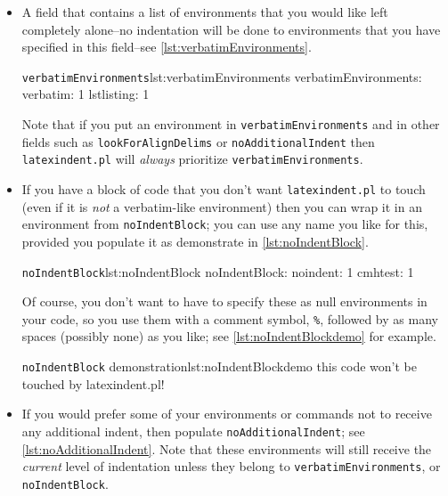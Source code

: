 \documentclass[11pt]{article}
\newcommand{\verbitem}[1]{\small\PVerb{#1}}
\begin{document}
\begin{itemize}
	\item[\verbitem{verbatimEnvironments}] A field that contains a list of environments
	      that you would like left completely alone--no indentation will be done
	      to environments that you have specified in this field--see \cref{lst:verbatimEnvironments}.


	      \begin{cmhlistings}[style=yaml]{\lstinline!verbatimEnvironments!}{lst:verbatimEnvironments}
verbatimEnvironments:
    verbatim: 1
    lstlisting: 1
	\end{cmhlistings}
	Note that if  you put an environment in \lstinline!verbatimEnvironments!
	and in other fields such as \lstinline!lookForAlignDelims! or \lstinline!noAdditionalIndent!
	then \lstinline!latexindent.pl! will \emph{always} prioritize \lstinline!verbatimEnvironments!.

	\item[\verbitem{noIndentBlock}] If you have a block of code that you don't
	      want \lstinline!latexindent.pl! to touch (even if it is \emph{not} a verbatim-like
	      environment) then you can wrap it in an environment from \lstinline!noIndentBlock!;
	      you can use any name you like for this, provided you populate it as demonstrate in
	      \cref{lst:noIndentBlock}.

	      \begin{cmhlistings}[style=yaml]{\lstinline!noIndentBlock!}{lst:noIndentBlock}
noIndentBlock:
    noindent: 1
    cmhtest: 1
	\end{cmhlistings}

	Of course, you don't want to have to specify these as null environments
	in your code, so you use them with a comment symbol, \lstinline!%!, followed
	by as many spaces (possibly none) as you like; see \cref{lst:noIndentBlockdemo} for
	example.
	\begin{cmhlistings}[style=demo,escapeinside={(*@}{@*)}]{\lstinline!noIndentBlock! demonstration}{lst:noIndentBlockdemo}
        this code
                won't
     be touched
                    by
             latexindent.pl!
	\end{cmhlistings}

	\item[\verbitem{noAdditionalIndent}] If you would prefer some of your
	      environments or commands not to receive any additional indent, then
	      populate \lstinline!noAdditionalIndent!; see \cref{lst:noAdditionalIndent}.
	      Note that these environments will still receive the \emph{current} level
	      of indentation unless they belong to \lstinline!verbatimEnvironments!, or \lstinline!noIndentBlock!.


\end{itemize}
\end{document}
